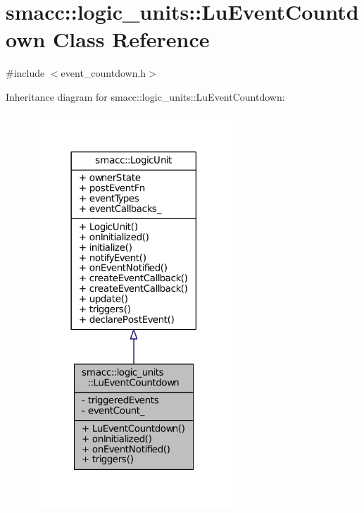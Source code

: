\hypertarget{classsmacc_1_1logic__units_1_1LuEventCountdown}{}\section{smacc\+:\+:logic\+\_\+units\+:\+:Lu\+Event\+Countdown Class Reference}
\label{classsmacc_1_1logic__units_1_1LuEventCountdown}


{\ttfamily \#include $<$event\+\_\+countdown.\+h$>$}



Inheritance diagram for smacc\+:\+:logic\+\_\+units\+:\+:Lu\+Event\+Countdown\+:
\nopagebreak
\begin{figure}[H]
\begin{center}
\leavevmode
\includegraphics[width=213pt]{classsmacc_1_1logic__units_1_1LuEventCountdown__inherit__graph}
\end{center}
\end{figure}



